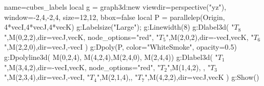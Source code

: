 \documentclass[border=5pt]{standalone}%
\begin{document}
\begin{luadraw}{name=cubes_labels}
local g = graph3d:new{ viewdir=perspective("yz"), window={-2,4,-2,4}, size={12,12}, bbox=false}
local P = parallelep(Origin, 4*vecI,4*vecJ,4*vecK)
g:Labelsize("Large"); g:Linewidth(8)
g:Dlabel3d(
    "$T_8$",M(0,2,2),{dir={vecJ,vecK}, node_options="red"},
    "$T_5$",M(2,0,2),{dir={-vecI,vecK}},
    "$T_6$",M(2,2,0),{dir={vecJ,-vecI}}
    )
g:Dpoly(P, {color="WhiteSmoke", opacity=0.5})
g:Dpolyline3d( {{M(0,2,4), M(4,2,4)},{M(2,4,0), M(2,4,4)}})
g:Dlabel3d(
    "$T_1$",M(3,4,2),{dir={-vecI,vecK}, node_options="red"},
    "$T_2$",M(1,4,2), {},
    "$T_3$",M(2,3,4),{dir={vecJ,-vecI}},
    "$T_4$",M(2,1,4),{},
    "$T_7$",M(4,2,2),{dir={vecJ,vecK}}    
    )
g:Show()
\end{luadraw}
\end{document}
